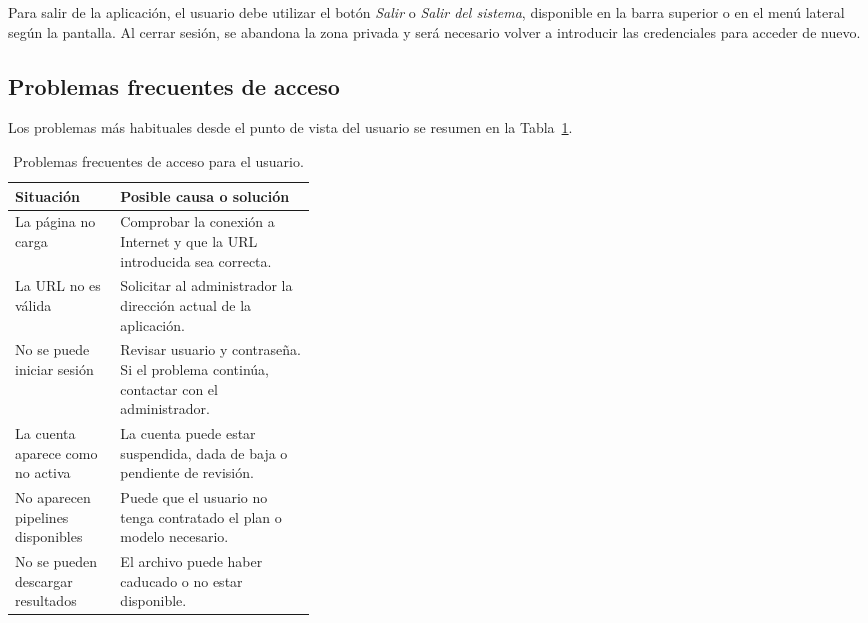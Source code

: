 Para salir de la aplicación, el usuario debe utilizar el botón \textit{Salir} o \textit{Salir del sistema}, disponible en la barra superior o en el menú lateral según la pantalla. Al cerrar sesión, se abandona la zona privada y será necesario volver a introducir las credenciales para acceder de nuevo.

\subsection{Problemas frecuentes de acceso}

Los problemas más habituales desde el punto de vista del usuario se resumen en la Tabla~\ref{tabla:problemas_acceso_usuario}.

\begin{table}[!htbp]
	\centering
	\small
	\renewcommand{\arraystretch}{1.15}
	\begin{tabularx}{\linewidth}{p{0.35\linewidth}X}
		\toprule
		\textbf{Situación} & \textbf{Posible causa o solución} \\
		\midrule
		La página no carga & Comprobar la conexión a Internet y que la URL introducida sea correcta. \\
		La URL no es válida & Solicitar al administrador la dirección actual de la aplicación. \\
		No se puede iniciar sesión & Revisar usuario y contraseña. Si el problema continúa, contactar con el administrador. \\
		La cuenta aparece como no activa & La cuenta puede estar suspendida, dada de baja o pendiente de revisión. \\
		No aparecen pipelines disponibles & Puede que el usuario no tenga contratado el plan o modelo necesario. \\
		No se pueden descargar resultados & El archivo puede haber caducado o no estar disponible. \\
		\bottomrule
	\end{tabularx}
	\caption[Problemas frecuentes de acceso]{Problemas frecuentes de acceso para el usuario.}
	\label{tabla:problemas_acceso_usuario}
\end{table}

